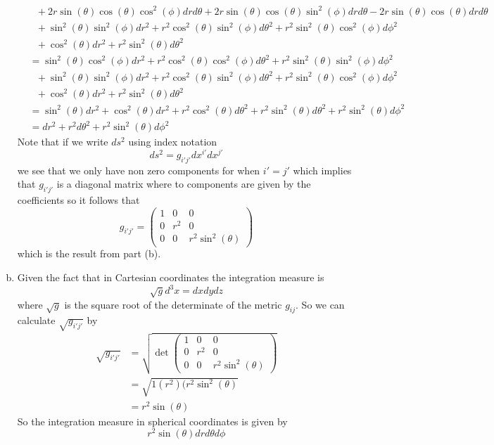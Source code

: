 \documentclass[11pt]{article}
\numberwithin{equation}{section}
\begin{document}
\begin{enumerate}[(a)]
\begin{align*}
&\ \ \ + 2r\sin(\theta)\cos(\theta)\cos^2(\phi)drd\theta  + 2r\sin(\theta)\cos(\theta)\sin^2(\phi)drd\theta - 2r\sin(\theta)\cos(\theta)drd\theta\\
&\ \ \ +\sin^2(\theta)\sin^2(\phi)dr^2 + r^2\cos^2(\theta)\sin^2(\phi)d\theta^2 + r^2\sin^2(\theta)\cos^2(\phi)d\phi^2 \\
&\ \ \ +\cos^2(\theta)dr^2 + r^2\sin^2(\theta)d\theta^2 \\
&= \sin^2(\theta)\cos^2(\phi)dr^2 + r^2\cos^2(\theta)\cos^2(\phi)d\theta^2 + r^2\sin^2(\theta)\sin^2(\phi)d\phi^2 \\
&\ \ \ +\sin^2(\theta)\sin^2(\phi)dr^2 + r^2\cos^2(\theta)\sin^2(\phi)d\theta^2 + r^2\sin^2(\theta)\cos^2(\phi)d\phi^2 \\
&\ \ \ +\cos^2(\theta)dr^2 + r^2\sin^2(\theta)d\theta^2 \\
&= \sin^2(\theta)dr^2 +\cos^2(\theta)dr^2+ r^2\cos^2(\theta)d\theta^2  + r^2\sin^2(\theta)d\theta^2 + r^2\sin^2(\theta)d\phi^2 \\
&= dr^2 + r^2d\theta^2  + r^2\sin^2(\theta)d\phi^2 
\end{align*}
Note that if we write $ds^2$ using index notation 
$$ds^2 = g_{i'j'}dx^{i'}dx^{j'}$$
we see that we only have non zero components for when $i'=j'$ which implies that $g_{i'j'}$ is a diagonal matrix where to components are given by the coefficients so it follows that
$$g_{i'j'} =  \left(\begin{array}{ccc}
	1	&0	&0\\
	0	&r^2	&0\\
	0	&0	&r^2\sin^2(\theta)
	\end{array}\right)$$
which is the result from part (b).

\item
Given the fact that in Cartesian coordinates the integration measure is
$$\sqrt{g}d^3x = dxdydz$$
where $\sqrt{g}$ is the square root of the determinate of the metric $g_{ij}$. So we can calculate $\sqrt{g_{i'j'}}$ by
\begin{align*}
\sqrt{g_{i'j'}} &= \sqrt{\det\left(\begin{array}{ccc}
				1	&0	&0\\
				0	&r^2	&0\\
				0	&0	&r^2\sin^2(\theta)
				\end{array}\right)}\\
&= \sqrt{1(r^2)(r^2\sin^2(\theta)}\\
&= r^2\sin(\theta)
\end{align*}
So the integration measure in spherical coordinates is given by
$$r^2\sin(\theta)drd\theta d\phi$$
\end{enumerate}
\end{document}
